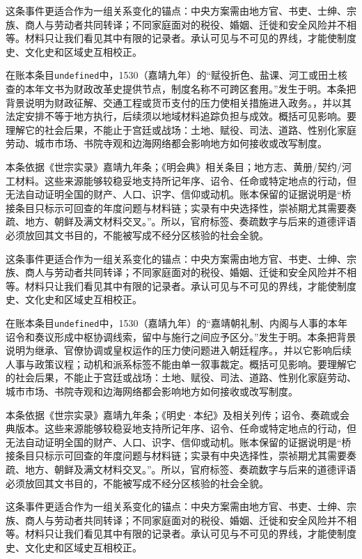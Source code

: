 这条事件更适合作为一组关系变化的锚点：中央方案需由地方官、书吏、士绅、宗族、商人与劳动者共同转译；不同家庭面对的税役、婚姻、迁徙和安全风险并不相等。材料只让我们看见其中有限的记录者。承认可见与不可见的界线，才能使制度史、文化史和区域史互相校正。

在账本条目\texttt{undefined}中，1530（嘉靖九年）的“赋役折色、盐课、河工或田土核查的本年文书为财政改革史提供节点，制度名称不可跨区套用。”发生于明。本条把背景说明为财政征解、交通工程或货币支付的压力使相关措施进入政务。，并以其法定安排不等于地方执行，后续须以地域材料追踪负担与成效。概括可见影响。要理解它的社会后果，不能止于宫廷或战场：土地、赋役、司法、道路、性别化家庭劳动、城市市场、书院寺观和边海网络都会影响地方如何接收或改写制度。

本条依据《世宗实录》嘉靖九年条；《明会典》相关条目；地方志、黄册/契约/河工材料。这些来源能够较稳妥地支持所记年序、诏令、任命或特定地点的行动，但无法自动证明全国的财产、人口、识字、信仰或动机。账本保留的证据说明是“桥接条目只标示可回查的年度问题与材料链；实录有中央选择性，崇祯期尤其需要奏疏、地方、朝鲜及满文材料交叉。”。所以，官府标签、奏疏数字与后来的道德评语必须放回其文书目的，不能被写成不经分区核验的社会全貌。

这条事件更适合作为一组关系变化的锚点：中央方案需由地方官、书吏、士绅、宗族、商人与劳动者共同转译；不同家庭面对的税役、婚姻、迁徙和安全风险并不相等。材料只让我们看见其中有限的记录者。承认可见与不可见的界线，才能使制度史、文化史和区域史互相校正。

在账本条目\texttt{undefined}中，1530（嘉靖九年）的“嘉靖朝礼制、内阁与人事的本年诏令和奏议形成中枢协调线索，留中与施行之间应予区分。”发生于明。本条把背景说明为继承、官僚协调或皇权运作的压力使问题进入朝廷程序。，并以它影响后续人事与政策议程；动机和派系标签不能由单一叙事裁定。概括可见影响。要理解它的社会后果，不能止于宫廷或战场：土地、赋役、司法、道路、性别化家庭劳动、城市市场、书院寺观和边海网络都会影响地方如何接收或改写制度。

本条依据《世宗实录》嘉靖九年条；《明史·本纪》及相关列传；诏令、奏疏或会典版本。这些来源能够较稳妥地支持所记年序、诏令、任命或特定地点的行动，但无法自动证明全国的财产、人口、识字、信仰或动机。账本保留的证据说明是“桥接条目只标示可回查的年度问题与材料链；实录有中央选择性，崇祯期尤其需要奏疏、地方、朝鲜及满文材料交叉。”。所以，官府标签、奏疏数字与后来的道德评语必须放回其文书目的，不能被写成不经分区核验的社会全貌。

这条事件更适合作为一组关系变化的锚点：中央方案需由地方官、书吏、士绅、宗族、商人与劳动者共同转译；不同家庭面对的税役、婚姻、迁徙和安全风险并不相等。材料只让我们看见其中有限的记录者。承认可见与不可见的界线，才能使制度史、文化史和区域史互相校正。

